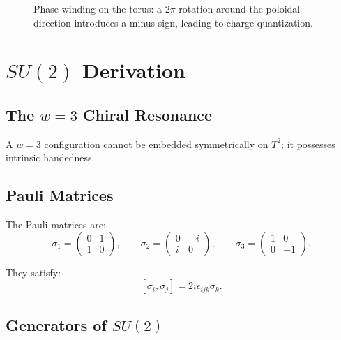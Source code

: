 \documentclass[12pt,oneside]{book}
\begin{document}
\begin{figure}[H]
\centering
{}
\caption{Phase winding on the torus: a $2\pi$ rotation around the poloidal direction introduces a minus sign, leading to charge quantization.}
\label{fig:charge_quantization}
\end{figure}

\chapter{$SU(2)$ Derivation}

\section{The $w=3$ Chiral Resonance}

A $w=3$ configuration cannot be embedded symmetrically on $T^2$; it possesses intrinsic handedness.

\section{Pauli Matrices}

The Pauli matrices are:
\[
\sigma_1 =
\begin{pmatrix}
0 & 1 \\
1 & 0
\end{pmatrix}, \qquad
\sigma_2 =
\begin{pmatrix}
0 & -i \\
i & 0
\end{pmatrix}, \qquad
\sigma_3 =
\begin{pmatrix}
1 & 0 \\
0 & -1
\end{pmatrix}.
\]

They satisfy:
\[
[\sigma_i, \sigma_j] = 2i\epsilon_{ijk}\sigma_k.
\]

\section{Generators of $SU(2)$}
\end{document}
